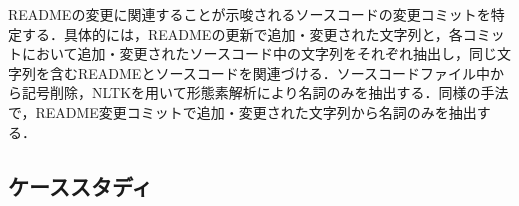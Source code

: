 \documentclass[uplatex,dvipdfmx,a4paper,twocolumn,base=11pt,jbase=11pt,ja=standard]{bxjsarticle}  %
\newcommand{\todo}[1]{\colorbox{yellow}{{\bf TODO}:}{\color{red} {\textbf{[#1]}}}}
\begin{document}
READMEの変更に関連することが示唆されるソースコードの変更コミットを特定する．具体的には，READMEの更新で追加・変更された文字列と，各コミットにおいて追加・変更されたソースコード中の文字列をそれぞれ抽出し，同じ文字列を含むREADMEとソースコードを関連づける．ソースコードファイル中から記号削除，NLTKを用いて形態素解析により名詞のみを抽出する．同様の手法で，README変更コミットで追加・変更された文字列から名詞のみを抽出する．


%
%




\subsection{ケーススタディ}
\end{document}
